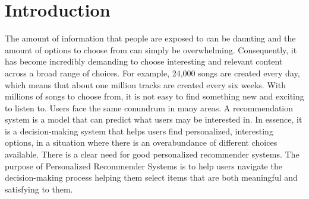 \chapter{Introduction}

The amount of information that people are exposed to can be daunting and the amount of options to choose from can simply be overwhelming. Consequently, it has become incredibly demanding to choose interesting and relevant content across a broad range of choices. For example, 24,000 songs are created every day, which means that about one million tracks are created every six weeks. With millions of songs to choose from, it is not easy to find something new and exciting to listen to. Users face the same conundrum in many areas. 
A recommendation system is a model that can predict what users may be interested in. In essence, it is a decision-making system that helps users find personalized, interesting options, in a situation where there is an overabundance of different choices 
available. There is a clear need for good personalized recommender systems. 
The purpose of Personalized Recommender Systems is to help users navigate the  decision-making process helping them select items that are both meaningful and satisfying to them.
